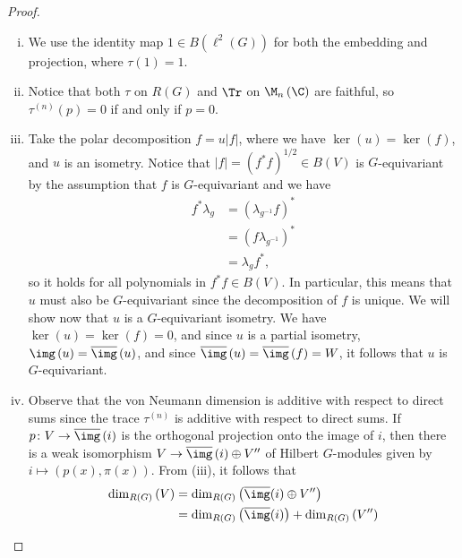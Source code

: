 \documentclass[10pt]{mypackage}
\begin{document}
\begin{proof}\hfill
  \begin{enumerate}[(i)]
    \item We use the identity map $1\in B\left( \ell^2(G) \right)$ for both the embedding and projection, where $\tau\left( 1 \right) = 1$.
    \item Notice that both $\tau$ on $R(G)$ and $\Tr$ on $\M_n\left( \C \right)$ are faithful, so $\tau^{(n)}(p) = 0$ if and only if $p = 0$.
    \item Take the polar decomposition $f = u \left\vert f \right\vert$, where we have $\ker\left( u \right) = \ker\left( f \right)$, and $u$ is an isometry. Notice that $ \left\vert f \right\vert = \left( f^{\ast}f \right)^{1/2}\in B\left( V \right) $ is $G$-equivariant by the assumption that $f$ is $G$-equivariant and we have
      \begin{align*}
        f^{\ast}\lambda_g &= \left( \lambda_{g^{-1}}f \right)^{\ast}\\
                          &= \left( f\lambda_{g^{-1}} \right)^{\ast}\\
                          &= \lambda_g f^{\ast},
      \end{align*}
      so it holds for all polynomials in $f^{\ast}f\in B\left( V \right)$. In particular, this means that $u$ must also be $G$-equivariant since the decomposition of $f$ is unique. We will show now that $u$ is a $G$-equivariant isometry. We have $\ker\left( u \right) = \ker\left( f \right) = 0$, and since $u$ is a partial isometry, $ \img\left( u \right) = \overline{\img}\left( u \right) $, and since $ \overline{\img}\left( u \right) = \overline{\img}\left( f \right) = W $, it follows that $u$ is $G$-equivariant.
    \item Observe that the von Neumann dimension is additive with respect to direct sums since the trace $\tau^{(n)}$ is additive with respect to direct sums. If $p\colon V\rightarrow \overline{\img}\left( i \right)$ is the orthogonal projection onto the image of $i$, then there is a weak isomorphism $V\rightarrow \overline{\img}\left( i \right) \oplus V''$ of Hilbert $G$-modules given by $i\mapsto \left( p(x),\pi(x) \right)$. From (iii), it follows that 
      \begin{align*}
        \dim_{R(G)}\left( V \right) &= \dim_{R(G)} \left( \overline{\img}(i) \oplus V'' \right)\\
                                    &= \dim_{R(G)} \left( \overline{\img}(i) \right) + \dim_{R(G)} \left( V'' \right)\\

\end{align*}
\end{enumerate}
\end{proof}
\end{document}
